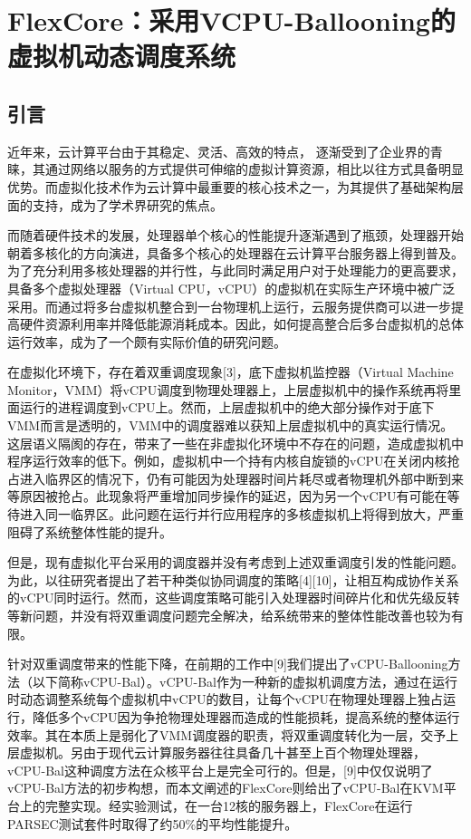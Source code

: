 
\chapter{FlexCore：采用VCPU-Ballooning的虚拟机动态调度系统}
\label{chap:flexcore}



\section{引言}

近年来，云计算平台由于其稳定、灵活、高效的特点， 逐渐受到了企业界的青睐，其通过网络以服务的方式提供可伸缩的虚拟计算资源，相比以往方式具备明显优势。而虚拟化技术作为云计算中最重要的核心技术之一，为其提供了基础架构层面的支持，成为了学术界研究的焦点。

而随着硬件技术的发展，处理器单个核心的性能提升逐渐遇到了瓶颈，处理器开始朝着多核化的方向演进，具备多个核心的处理器在云计算平台服务器上得到普及。为了充分利用多核处理器的并行性，与此同时满足用户对于处理能力的更高要求，具备多个虚拟处理器（Virtual CPU，vCPU）的虚拟机在实际生产环境中被广泛采用。而通过将多台虚拟机整合到一台物理机上运行，云服务提供商可以进一步提高硬件资源利用率并降低能源消耗成本。因此，如何提高整合后多台虚拟机的总体运行效率，成为了一个颇有实际价值的研究问题。

在虚拟化环境下，存在着双重调度现象[3]，底下虚拟机监控器（Virtual Machine Monitor，VMM）将vCPU调度到物理处理器上，上层虚拟机中的操作系统再将里面运行的进程调度到vCPU上。然而，上层虚拟机中的绝大部分操作对于底下VMM而言是透明的，VMM中的调度器难以获知上层虚拟机中的真实运行情况。这层语义隔阂的存在，带来了一些在非虚拟化环境中不存在的问题，造成虚拟机中程序运行效率的低下。例如，虚拟机中一个持有内核自旋锁的vCPU在关闭内核抢占进入临界区的情况下，仍有可能因为处理器时间片耗尽或者物理机外部中断到来等原因被抢占。此现象将严重增加同步操作的延迟，因为另一个vCPU有可能在等待进入同一临界区。此问题在运行并行应用程序的多核虚拟机上将得到放大，严重阻碍了系统整体性能的提升。

但是，现有虚拟化平台采用的调度器并没有考虑到上述双重调度引发的性能问题。为此，以往研究者提出了若干种类似协同调度的策略[4][10]，让相互构成协作关系的vCPU同时运行。然而，这些调度策略可能引入处理器时间碎片化和优先级反转等新问题，并没有将双重调度问题完全解决，给系统带来的整体性能改善也较为有限。

针对双重调度带来的性能下降，在前期的工作中[9]我们提出了vCPU-Ballooning方法（以下简称vCPU-Bal）。vCPU-Bal作为一种新的虚拟机调度方法，通过在运行时动态调整系统每个虚拟机中vCPU的数目，让每个vCPU在物理处理器上独占运行，降低多个vCPU因为争抢物理处理器而造成的性能损耗，提高系统的整体运行效率。其在本质上是弱化了VMM调度器的职责，将双重调度转化为一层，交予上层虚拟机。另由于现代云计算服务器往往具备几十甚至上百个物理处理器，vCPU-Bal这种调度方法在众核平台上是完全可行的。但是，[9]中仅仅说明了vCPU-Bal方法的初步构想，而本文阐述的FlexCore则给出了vCPU-Bal在KVM平台上的完整实现。经实验测试，在一台12核的服务器上，FlexCore在运行PARSEC测试套件时取得了约50\%的平均性能提升。

